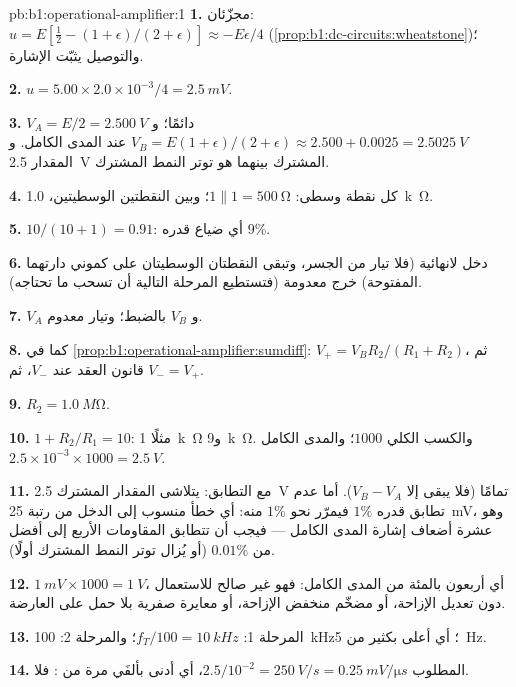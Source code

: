 \begin{solution}{pb:b1:operational-amplifier:1}
\textbf{1.} مجزّئان: $u = E[\tfrac12 - (1 + \epsilon)/(2 + \epsilon)]
\approx -E\epsilon/4$ (\cref{prop:b1:dc-circuits:wheatstone})؛ والتوصيل
يثبّت الإشارة.

\textbf{2.} $u = 5.00 \times 2.0\times10^{-3}/4 = \qty{2.5}{mV}$.

\textbf{3.} $V_A = E/2 = \qty{2.500}{V}$ دائمًا؛ و$V_B = E(1 + \epsilon)/(2 +
\epsilon) \approx 2.500 + 0.0025 = \qty{2.5025}{V}$ عند المدى الكامل. و
المقدار \qty{2.5}{V} المشترك بينهما هو توتر النمط المشترك.

\textbf{4.} كل نقطة وسطى: $1 \parallel 1 = \qty{500}{\ohm}$؛ وبين
النقطتين الوسطيتين، \qty{1.0}{k\ohm}.

\textbf{5.} $10/(10 + 1) = 0.91$: أي ضياع قدره $9\%$.

\textbf{6.}  دخل لانهائية (فلا تيار من الجسر، وتبقى
النقطتان الوسطيتان على كموني دارتهما المفتوحة)  خرج
معدومة (فتستطيع المرحلة التالية أن تسحب ما تحتاجه).

\textbf{7.} $V_A$ و $V_B$ بالضبط؛ وتيار معدوم.

\textbf{8.} كما في \cref{prop:b1:operational-amplifier:sumdiff}: $V_+ =
V_BR_2/(R_1 + R_2)$، ثم قانون العقد عند $V_-$، ثم $V_- = V_+$.

\textbf{9.} $R_2 = \qty{1.0}{M\ohm}$.

\textbf{10.} $1 + R_2/R_1 = 10$: مثلًا \qty{1}{k\ohm} و\qty{9}{k\ohm}.
والكسب الكلي $1000$؛ والمدى الكامل $2.5 \times 10^{-3} \times 1000 = \qty{2.5}{V}$.

\textbf{11.} مع التطابق: يتلاشى المقدار المشترك \qty{2.5}{V} تمامًا (فلا يبقى إلا
$V_B - V_A$). أما عدم تطابق قدره $1\%$ فيمرّر نحو $1\%$ منه: أي
خطأ منسوب إلى الدخل من رتبة \qty{25}{mV}، وهو عشرة أضعاف إشارة المدى الكامل
--- فيجب أن تتطابق المقاومات الأربع إلى أفضل من $0.01\%$
(أو يُزال توتر النمط المشترك أولًا).

\textbf{12.} $1\ \unit{mV} \times 1000 = \qty{1}{V}$، أي أربعون بالمئة من المدى
الكامل: فهو غير صالح للاستعمال دون تعديل الإزاحة، أو مضخّم منخفض
الإزاحة، أو معايرة صفرية بلا حمل على العارضة.

\textbf{13.} المرحلة 1: $f_T/100 = \qty{10}{kHz}$؛ والمرحلة 2: \qty{100}{kHz}؛
أي أعلى بكثير من \qty{5}{Hz}.

\textbf{14.} المطلوب $2.5/10^{-2} = \qty{250}{V/s} = \qty{0.25}{mV/\micro s}$،
أي أدنى بألفَي مرة من : فلا.


\end{solution}
